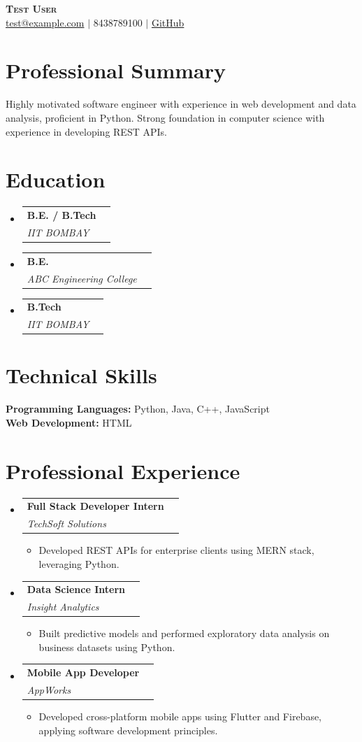\documentclass[a4paper,10pt]{article}
\makeatletter
\newcommand{\resumeItem}[1]{
  \item\small{#1 \vspace{-2pt}}
}
\newcommand{\resumeSubheading}[4]{
  \vspace{-1pt}\item
    \begin{tabular*}{0.97\textwidth}[t]{l@{\extracolsep{\fill}}r}
      \textbf{#1} & \textbf{#2} \\
      \textit{\small#3} & \textit{\small #4} \\
    \end{tabular*}\vspace{-5pt}
}
\newcommand{\resumeSubHeadingListStart}{\begin{itemize}[leftmargin=0.15in, label={}]}
\newcommand{\resumeSubHeadingListEnd}{\end{itemize}}
\newcommand{\resumeItemListStart}{\begin{itemize}[leftmargin=0.2in]}
\newcommand{\resumeItemListEnd}{\end{itemize}\vspace{-5pt}}
\makeatother
\begin{document}
\begin{minipage}[t]{0.75\textwidth}
  \begin{center}
    {\Huge\bfseries\scshape Test User} \\[8pt]
    \small 
    \href{mailto:test@example.com}{test@example.com}%
     $|$ 8438789100%
     $|$ \href{BHUVANESH-SSN}{GitHub}%
      \end{center}
\end{minipage}%

\vspace{8pt}

\section{Professional Summary}
\small{Highly motivated software engineer with experience in web development and data analysis, proficient in Python. Strong foundation in computer science with experience in developing REST APIs.}
\vspace{6pt}


\section{Education}
\resumeSubHeadingListStart
  \resumeSubheading
    {B.E. / B.Tech}{}
    {IIT BOMBAY}{}
  \resumeSubheading
    {B.E.}{}
    {ABC Engineering College}{}
  \resumeSubheading
    {B.Tech}{}
    {IIT BOMBAY}{}
\resumeSubHeadingListEnd
\vspace{4pt}

\section{Technical Skills}
\small{
    \textbf{Programming Languages:} Python, Java, C++, JavaScript \\
    \textbf{Web Development:} HTML \\
  }
\vspace{6pt}

\section{Professional Experience}
\resumeSubHeadingListStart
  \resumeSubheading
    {Full Stack Developer Intern}{}
    {TechSoft Solutions}{}
        \resumeItemListStart
            \resumeItem{Developed REST APIs for enterprise clients using MERN stack, leveraging Python.}
          \resumeItemListEnd
          \resumeSubheading
    {Data Science Intern}{}
    {Insight Analytics}{}
        \resumeItemListStart
            \resumeItem{Built predictive models and performed exploratory data analysis on business datasets using Python.}
          \resumeItemListEnd
          \resumeSubheading
    {Mobile App Developer}{}
    {AppWorks}{}
        \resumeItemListStart
            \resumeItem{Developed cross-platform mobile apps using Flutter and Firebase, applying software development principles.}
          \resumeItemListEnd
        \resumeSubHeadingListEnd
\vspace{4pt}
\end{document}
